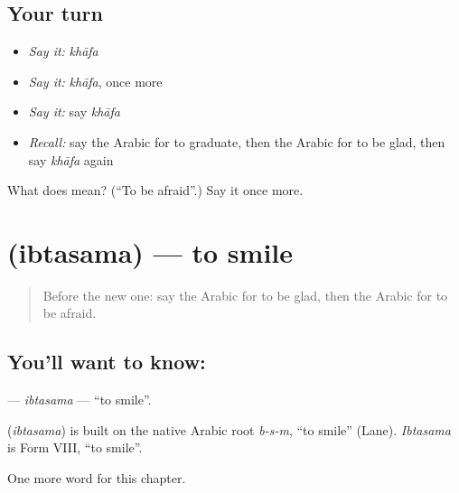 \subsection*{Your turn}
\begin{itemize}
\raggedright
  \item \emph{Say it:} \emph{khāfa}
  \item \emph{Say it:} \emph{khāfa}, once more
  \item \emph{Say it:} say \emph{khāfa}
  \item \emph{Recall:} say the Arabic for to graduate, then the Arabic for to be glad, then say \emph{khāfa} again
\end{itemize}

\begin{tcolorbox}[breakable,colback=teal!4,colframe=teal!35!black,title={Before you move on}]
What does  mean? (\textquotedblleft{}To be afraid\textquotedblright{}.) Say it once more.
\end{tcolorbox}
\section[\texorpdfstring{\ar{ابتسم} (ibtasama)}{ابتسم (ibtasama)}]{ (ibtasama) — to smile}

\label{lesson:AR-C257-ibtasama}



\begin{quote}
Before the new one: say the Arabic for to be glad, then the Arabic for to be afraid.
\end{quote}

\subsection*{You'll want to know: }
\textbf{} — \emph{ibtasama} — \textquotedblleft{}to smile\textquotedblright{}.

\begin{cousinweb}
\textbf{} (\emph{ibtasama}) is built on the native Arabic root \emph{b-s-m}, \textquotedblleft{}to smile\textquotedblright{} (Lane). \emph{Ibtasama} is Form VIII, \textquotedblleft{}to smile\textquotedblright{}.
\end{cousinweb}

\begin{grammarlens}[title={What you've built}]
One more word for this chapter.
\end{grammarlens}

